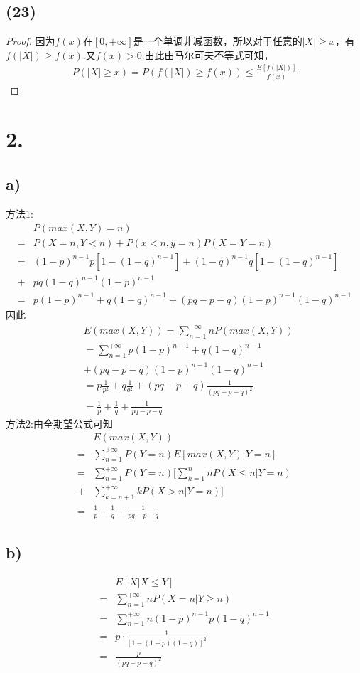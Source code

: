 \documentclass[twocolumn]{article}
\begin{document}
\begin{CJK}{UTF8}{gbsn}
			\subsection*{(23)}
				\begin{proof}
					因为$f(x)$在$[0,+\infty]$是一个单调非减函数，所以对于任意的$|X|\ge x$，有$f(|X|)\ge f(x)$.又$f(x)>0$.由此由马尔可夫不等式可知，\begin{align*}
						P(|X|\ge x)=P(f(|X|)\ge f(x))\le\frac{E[f(|X|)]}{f(x)}
					\end{align*}
				\end{proof}
			\section*{2.}
			\subsection*{a)}
				方法1:\begin{align*}
				& P(max(X,Y)=n)\\
				= & P(X=n,Y<n)+P(x<n,y=n)P(X=Y=n)\\
				= & (1-p)^{n-1}p[1-(1-q)^{n-1}]+(1-q)^{n-1}q[1-(1-q)^{n-1}]\\
				+ & pq(1-q)^{n-1}(1-p)^{n-1}\\
				= & p(1-p)^{n-1}+q(1-q)^{n-1}+(pq-p-q)(1-p)^{n-1}(1-q)^{n-1}
				\end{align*}
				因此\begin{align*}
					& E(max(X,Y))=\sum_{n=1}^{+\infty}nP(max(X,Y)) \\
					& = \sum_{n=1}^{+\infty}p(1-p)^{n-1}+q(1-q)^{n-1}\\
					& +(pq-p-q)(1-p)^{n-1}(1-q)^{n-1}\\
					& = p\frac{1}{p^2}+q\frac{1}{q^2}+(pq-p-q)\frac{1}{(pq-p-q)^2}\\
					& = \frac{1}{p}+\frac{1}{q}+\frac{1}{pq-p-q}
				\end{align*}
				方法2:由全期望公式可知\begin{align*}
					& E(max(X,Y))\\
					= & \sum_{n=1}^{+\infty}P(Y=n)E[max(X,Y)|Y=n]\\
					= & \sum_{n=1}^{+\infty}P(Y=n)[\sum_{k=1}^{n}nP(X\le n|Y=n)\\
					+ & \sum_{k=n+1}^{+\infty}kP(X>n|Y=n)]\\
					= & \frac{1}{p}+\frac{1}{q}+\frac{1}{pq-p-q}
				\end{align*}
			\subsection*{b)}
				\begin{align*}
					& E[X|X\le Y]\\
					= & \sum_{n=1}^{+\infty}nP(X=n|Y\ge n)\\
					= & \sum_{n=1}^{+\infty}n(1-p)^{n-1}p(1-q)^{n-1}\\
					= & p\cdot\frac{1}{[1-(1-p)(1-q)]^2}\\
					= & \frac{p}{(pq-p-q)^2}
				\end{align*}

\end{CJK}
\end{document}
